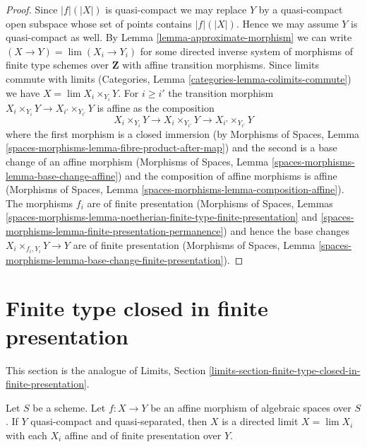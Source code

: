 \begin{proof}
Since $|f|(|X|)$ is quasi-compact we may replace $Y$ by a quasi-compact
open subspace whose set of points contains $|f|(|X|)$. Hence we may assume
$Y$ is quasi-compact as well.
By Lemma \ref{lemma-approximate-morphism} we can write
$(X \to Y) = \lim (X_i \to Y_i)$ for some directed inverse system
of morphisms of finite type schemes over $\mathbf{Z}$ with
affine transition morphisms. Since limits commute with limits
(Categories, Lemma \ref{categories-lemma-colimits-commute})
we have $X = \lim X_i \times_{Y_i} Y$. For $i \geq i'$
the transition morphism
$X_i \times_{Y_i} Y \to X_{i'} \times_{Y_{i'}} Y$ is affine as
the composition
$$
X_i \times_{Y_i} Y \to X_i \times_{Y_{i'}} Y \to X_{i'} \times_{Y_{i'}} Y
$$
where the first morphism is a closed immersion (by
Morphisms of Spaces, Lemma
\ref{spaces-morphisms-lemma-fibre-product-after-map})
and the second is a base change of an affine morphism
(Morphisms of Spaces, Lemma \ref{spaces-morphisms-lemma-base-change-affine})
and the composition of affine morphisms is affine
(Morphisms of Spaces, Lemma \ref{spaces-morphisms-lemma-composition-affine}).
The morphisms $f_i$ are of finite presentation
(Morphisms of Spaces, Lemmas
\ref{spaces-morphisms-lemma-noetherian-finite-type-finite-presentation} and
\ref{spaces-morphisms-lemma-finite-presentation-permanence})
and hence the base changes $X_i \times_{f_i, Y_i} Y \to Y$
are of finite presentation
(Morphisms of Spaces, Lemma
\ref{spaces-morphisms-lemma-base-change-finite-presentation}).
\end{proof}






\section{Finite type closed in finite presentation}
\label{section-finite-type-closed-in-finite-presentation}

\noindent
This section is the analogue of
Limits, Section \ref{limits-section-finite-type-closed-in-finite-presentation}.

\begin{lemma}
\label{lemma-affine-morphism-is-limit}
Let $S$ be a scheme. Let $f : X \to Y$ be an affine morphism of algebraic
spaces over $S$. If $Y$ quasi-compact and
quasi-separated, then $X$ is a directed limit $X = \lim X_i$
with each $X_i$ affine and of finite presentation over $Y$.
\end{lemma}

